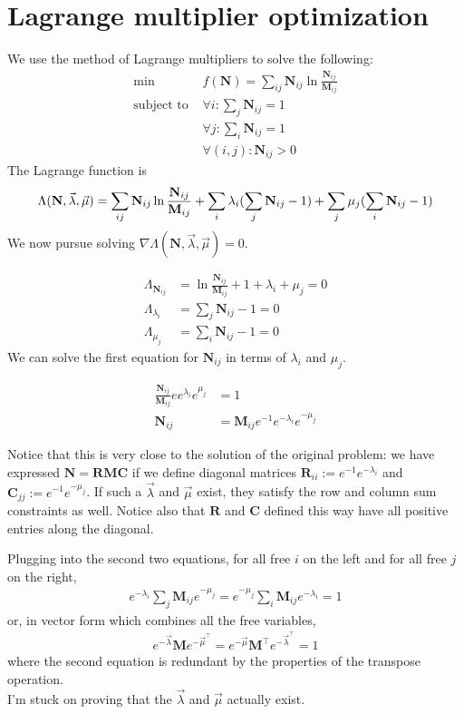 \documentclass[10pt,a4paper]{article}
\newcommand{\matr}[1]{\mathbf{#1}} %
\newcommand{\tr}[0]{{\intercal}}
\DeclarePairedDelimiter{\paren}{(}{)}
\begin{document}
\section{Lagrange multiplier optimization}
We use the method of Lagrange multipliers to solve the following:
\begin{align*}
\min\;&{f(\matr{N}) = \sum_{ij} \matr{N}_{ij} \ln \frac{\matr{N}_{ij}}{\matr{M}_{ij}}} \\
\text{subject to } &\forall i: \sum_j \matr{N}_{ij} = 1 \\
&\forall j: \sum_i \matr{N}_{ij} = 1 \\
&\forall (i,j): \matr{N}_{ij} > 0
\end{align*}
The Lagrange function is 
\[
\Lambda(\matr{N},\vec{\lambda}, \vec{\mu}) = 
\sum_{ij} \matr{N}_{ij} \ln \frac{\matr{N}_{ij}}{\matr{M}_{ij}} 
+ \sum_i \lambda_i \paren{\sum_j \matr{N}_{ij} - 1}
+ \sum_j \mu_j \paren{\sum_i \matr{N}_{ij} - 1}
\]
We now pursue solving $\nabla \Lambda(\matr{N},\vec{\lambda}, \vec{\mu}) = 0$.

\begin{align*}
\Lambda_{\matr{N}_{ij}} &= \ln{\frac{\matr{N}_{ij}}{\matr{M}_{ij}}} + 1 
+ \lambda_{i} + \mu_j = 0 \\
\Lambda_{\lambda_i} &= \sum_j \matr{N}_{ij} - 1 = 0 \\
\Lambda_{\mu_j} &= \sum_i \matr{N}_{ij} - 1 = 0
\end{align*}
We can solve the first equation for $\matr{N}_{ij}$ in terms of $\lambda_i$ and $\mu_j$.

\begin{align*}
\frac{\matr{N}_{ij}}{\matr{M}_{ij}} ee^{\lambda_i}e^{\mu_j} &= 1 \\
\matr{N}_{ij} &= \matr{M}_{ij} e^{-1}e^{-\lambda_i}e^{-\mu_j}
\end{align*}

Notice that this is very close to the solution 
of the original problem: we have expressed 
$\matr{N} = \matr{R}\matr{M}\matr{C}$
if we define diagonal matrices 
$\matr{R}_{ii} := e^{-1}e^{-\lambda_i}$
and $\matr{C}_{jj} := e^{-1}e^{-\mu_j}$.
If such a $\vec{\lambda}$ and $\vec{\mu}$ exist,
they satisfy the row and column sum constraints as well.
Notice also that $\matr{R}$ and $\matr{C}$ defined this way have all positive entries along the diagonal.

Plugging into the second two equations, for all free $i$ on the left and for all free $j$ on the right,
\begin{align*}
e^{-\lambda_i} \sum_j \matr{M}_{ij} e^{-\mu_j}
= e^{-\mu_j} \sum_i \matr{M}_{ij} e^{-\lambda_i}
= 1
\end{align*}
or, in vector form which combines all the free variables,
\begin{align*}
e^{-\vec{\lambda}} \matr{M} e^{-\vec{\mu}^\tr}
= e^{-\vec{\mu}} \matr{M^\tr} e^{-\vec{\lambda}^\tr}
= 1
\end{align*}
where the second equation is redundant by the properties of the transpose operation.
\\

I'm stuck on proving that the $\vec{\lambda}$ and $\vec{\mu}$ actually exist.

%
%
\end{document}
